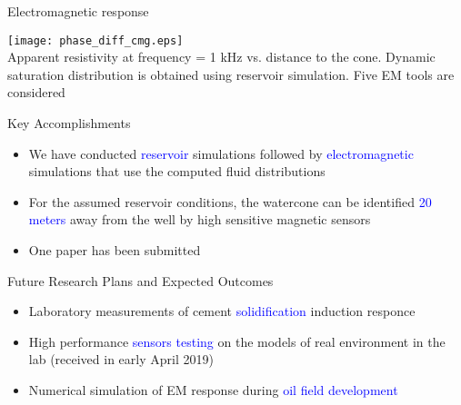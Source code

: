 \documentclass[aspectratio=169]{beamer}
\begin{document}
\begin{frame}{Electromagnetic response}

	\centering
	\texttt{[image: phase\_diff\_cmg.eps]}
	\\ Apparent resistivity at frequency = 1 kHz vs. distance to the cone. Dynamic saturation distribution is obtained using reservoir simulation. Five EM tools are considered

\end{frame}

\begin{frame}{Key Accomplishments}

\begin{LARGE}

\begin{itemize}

\item We have conducted \textcolor{blue} {reservoir} simulations followed by \textcolor{blue} {electromagnetic} simulations that use the computed fluid distributions
\item For the assumed reservoir conditions, the watercone can be identified \textcolor{blue} {20 meters} away from the well by high sensitive magnetic sensors
\item One paper has been submitted
\end{itemize}

\end{LARGE}

\end{frame}


%
%



\begin{frame}{Future Research Plans and Expected Outcomes}

\begin{LARGE}

\begin{itemize}
\item Laboratory measurements of cement \textcolor{blue} {solidification} induction responce
\item High performance \textcolor{blue} {sensors testing} on the models of real environment in the lab (received in early April 2019)
\item Numerical simulation of EM response during \textcolor{blue} {oil field development}
\end{itemize}

\end{LARGE}
\end{frame}
\end{document}
